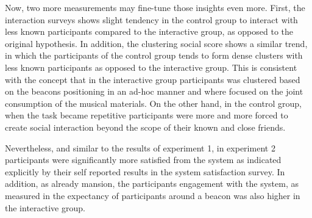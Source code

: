 \documentclass[a4paper,11pt]{article}
\begin{document}
Now, two more measurements may fine-tune those insights even more.
First, the interaction surveys shows slight tendency in the control group to interact with less known participants compared to the interactive group, as opposed to the original hypothesis.
In addition, the clustering social score shows a similar trend, in which the participants of the control group tends to form dense clusters with less known participants as opposed to the interactive group.
This is consistent with the concept that in the interactive group participants was clustered based on the beacons positioning in an ad-hoc manner and where focused on the joint consumption of the musical materials.
On the other hand, in the control group, when the task became repetitive participants were more and more forced to create social interaction beyond the scope of their known and close friends.

Nevertheless, and similar to the results of experiment 1, in experiment 2 participants were significantly more satisfied from the system as indicated explicitly by their self reported results in the system satisfaction survey.
In addition, as already mansion, the participants engagement with the system, as measured in the expectancy of participants around a beacon was also higher in the interactive group.

\end{document}
